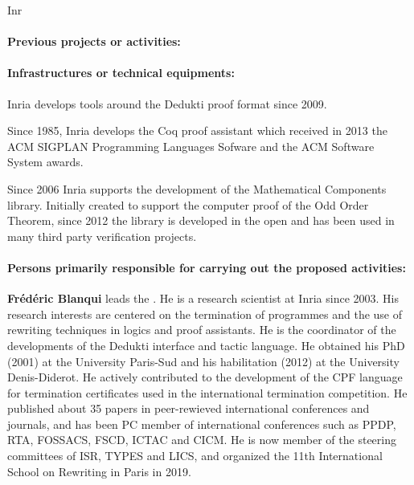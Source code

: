 \begin{sitedescription}{Inr}
\paragraph*{Previous projects or activities:}


\begin{compactitem}
\item 
\end{compactitem}

\paragraph*{Infrastructures or technical equipments:}


\begin{compactitem}
\item Inria develops tools around the Dedukti proof format since 2009.
\item Since 1985, Inria develops the Coq proof assistant which
  received in 2013 the ACM SIGPLAN Programming Languages Sofware and
  the ACM Software System awards.
\item Since 2006 Inria supports the development of the Mathematical Components
  library. Initially created to support the computer proof of
  the Odd Order Theorem, since 2012 the library is developed in the open
  and has been used in many third party verification projects.
\end{compactitem}

\paragraph*{Persons primarily responsible for carrying out the proposed activities:}

\begin{compactitem} %

\item{\bf Frédéric Blanqui} leads the . He is a research scientist at Inria since 2003. His research interests are centered on the termination of programmes and the use of rewriting techniques in logics and proof assistants. He is the coordinator of the developments of the Dedukti interface and tactic language. He obtained his PhD (2001) at the University Paris-Sud and his habilitation (2012) at the University Denis-Diderot. He actively contributed to the development of the CPF language for termination certificates used in the international termination competition. He published about 35 papers in peer-rewieved international conferences and journals, and has been PC member of international conferences such as PPDP, RTA, FOSSACS, FSCD, ICTAC and CICM. He is now member of the steering committees of ISR, TYPES and LICS, and organized the 11th International School on Rewriting in Paris in 2019.


\end{compactitem}
\end{sitedescription}
